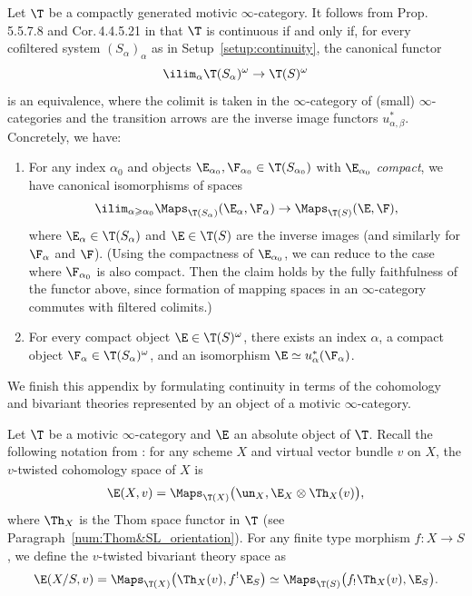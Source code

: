 \begin{num}\label{num:continuity compact}
Let $\T$ be a compactly generated motivic $\infty$-category.
It follows from Prop.\,5.5.7.8 and Cor.\,4.4.5.21 in \cite{LurieHTT} that $\T$ is continuous if and only if, for every cofiltered system $(S_\alpha)_\alpha$ as in Setup~\ref{setup:continuity}, the canonical functor
\[
\ilim_\alpha \T(S_\alpha)^\omega \to \T(S)^\omega
\]
is an equivalence, where the colimit is taken in the $\infty$-category of (small) $\infty$-categories and the transition arrows are the inverse image functors $u_{\alpha,\beta}^*$.
Concretely, we have:
\begin{enumerate}
\item\label{item:continuity compact maps}
For any index $\alpha_0$ and objects $\E_{\alpha_0},\F_{\alpha_0} \in \T(S_{\alpha_0})$ with $\E_{\alpha_0}$ \emph{compact}, we have canonical isomorphisms of spaces
\begin{equation*}
\ilim_{\alpha\geqslant\alpha_0} \Maps_{\T(S_\alpha)}(\E_\alpha, \F_\alpha)
\to \Maps_{\T(S)}(\E, \F),
\end{equation*}
where $\E_\alpha \in \T(S_\alpha)$ and $\E \in \T(S)$ are the inverse images (and similarly for $\F_\alpha$ and $\F$).
(Using the compactness of $\E_{\alpha_0}$, we can reduce to the case where $\F_{\alpha_0}$ is also compact.
Then the claim holds by the fully faithfulness of the functor above, since formation of mapping spaces in an $\infty$-category commutes with filtered colimits.)

\item
For every compact object $\E \in \T(S)^\omega$, there exists an index $\alpha$, a compact object $\F_\alpha \in \T(S_\alpha)^\omega$, and an isomorphism $\E \simeq u_\alpha^*(\F_\alpha)$.
\end{enumerate}
\end{num}

We finish this appendix by formulating continuity in terms of the cohomology and bivariant theories represented by an object of a motivic $\infty$-category.

\begin{notation}\label{notation:cohomology+bivariant}
Let $\T$ be a motivic $\infty$-category and $\E$ an absolute object of $\T$.
Recall the following notation from \cite[Def.\,2.2.1]{DJK}: for any scheme $X$ and virtual vector bundle $v$ on $X$, the $v$-twisted cohomology space of $X$ is
\[
\E(X, v) = \Maps_{\T(X)}\big( \un_X, \E_X \otimes \Th_X(v) \big),
\]
where $\Th_X$ is the Thom space functor in $\T$ (see Paragraph~\ref{num:Thom&SL_orientation}).
For any finite type morphism $f : X \to S$, we define the $v$-twisted bivariant theory space as
\[
\E(X/S, v)
= \Maps_{\T(X)}\big( \Th_X(v), f^!\E_S \big)
\simeq \Maps_{\T(S)}\big( f_!\Th_X(v), \E_S \big).
\]
\end{notation}

